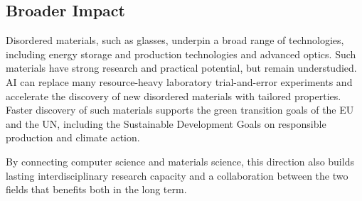 \subsection*{Broader Impact}
Disordered materials, such as glasses, underpin a broad range of technologies, including energy storage and production technologies and advanced optics. Such materials have strong research and practical potential, but remain understudied.
AI can replace many resource-heavy laboratory trial-and-error experiments and accelerate the discovery of new disordered materials with tailored properties.
Faster discovery of such materials supports the green transition goals of the EU and the UN, including the Sustainable Development Goals on responsible production and climate action.

\vspace{\entryskip}
By connecting computer science and materials science, this direction also builds lasting interdisciplinary research capacity and a collaboration between the two fields that benefits both in the long term.
